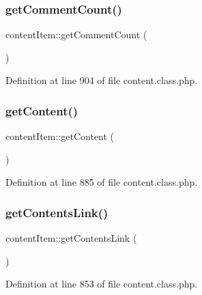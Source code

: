 \hypertarget{classcontentItem_ae2402a7138ef2a2c9dae2d76aa31228f}{}\label{classcontentItem_ae2402a7138ef2a2c9dae2d76aa31228f} 
\subsubsection{\texorpdfstring{get\+Comment\+Count()}{getCommentCount()}}
{\footnotesize\ttfamily content\+Item\+::get\+Comment\+Count (\begin{DoxyParamCaption}{ }\end{DoxyParamCaption})}



Definition at line 904 of file content.\+class.\+php.

\hypertarget{classcontentItem_adb35fd4206e162bccd6ff9f5ac832e09}{}\label{classcontentItem_adb35fd4206e162bccd6ff9f5ac832e09} 
\subsubsection{\texorpdfstring{get\+Content()}{getContent()}}
{\footnotesize\ttfamily content\+Item\+::get\+Content (\begin{DoxyParamCaption}{ }\end{DoxyParamCaption})}



Definition at line 885 of file content.\+class.\+php.

\hypertarget{classcontentItem_a80a161de842f1a890fdbfee439674881}{}\label{classcontentItem_a80a161de842f1a890fdbfee439674881} 
\subsubsection{\texorpdfstring{get\+Contents\+Link()}{getContentsLink()}}
{\footnotesize\ttfamily content\+Item\+::get\+Contents\+Link (\begin{DoxyParamCaption}{ }\end{DoxyParamCaption})}



Definition at line 853 of file content.\+class.\+php.

